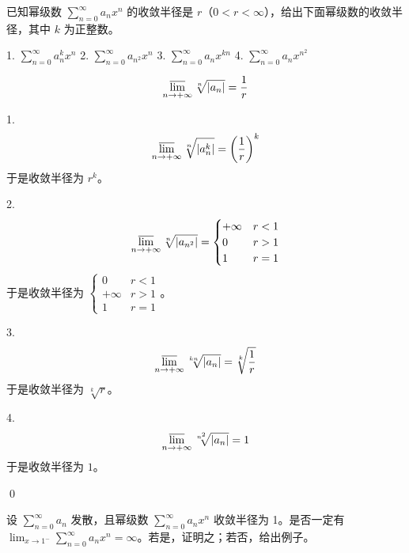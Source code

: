 \begin{ques}
已知幂级数 $\sum _{n=0}^{\infty } a_{n} x^{n}$ 的收敛半径是 $r$（$0< r< \infty $），给出下面幂级数的收敛半径，其中 $k$ 为正整数。

1. $\displaystyle \sum _{n=0}^{\infty } a_{n}^{k} x^{n}$ 2. $\displaystyle \sum _{n=0}^{\infty } a_{n^{2}} x^{n}$ 3. $\displaystyle \sum _{n=0}^{\infty } a_{n} x^{kn}$ 4. $\displaystyle \sum _{n=0}^{\infty } a_{n} x^{n^{2}}$
\end{ques}
\begin{equation*}
	\varlimsup _{n\rightarrow +\infty }\sqrt[n]{|a_{n} |} =\frac{1}{r}
\end{equation*}


1. 
\begin{equation*}
	\varlimsup _{n\rightarrow +\infty }\sqrt[n]{|a_{n}^{k} |} =\left(\frac{1}{r}\right)^{k}
\end{equation*}
于是收敛半径为 $\displaystyle r^{k}$。

2.
\begin{equation*}
	\varlimsup _{n\rightarrow +\infty }\sqrt[n]{|a_{n^{2}} |} =\begin{cases}
		+\infty  & r< 1\\
		0 & r >1\\
		1 & r=1
	\end{cases}
\end{equation*}
于是收敛半径为 $\displaystyle \begin{cases}
	0 & r< 1\\
	+\infty  & r >1\\
	1 & r=1
\end{cases}$。

3.
\begin{equation*}
	\varlimsup _{n\rightarrow +\infty }\sqrt[kn]{|a_{n} |} =\sqrt[k]{\frac{1}{r}}
\end{equation*}
于是收敛半径为 $\displaystyle \sqrt[k]{r}$。

4.
\begin{equation*}
	\varlimsup _{n\rightarrow +\infty }\sqrt[n^{2}]{|a_{n} |} =1
\end{equation*}
于是收敛半径为 $\displaystyle 1$。

\qed 



\begin{ques}
设 $\sum _{n=0}^{\infty } a_{n}$ 发散，且幂级数 $\sum _{n=0}^{\infty } a_{n} x^{n}$ 收敛半径为 1。是否一定有 $\lim _{x\rightarrow 1^{-}}\sum _{n=0}^{\infty } a_{n} x^{n} =\infty $。若是，证明之；若否，给出例子。
\end{ques}



